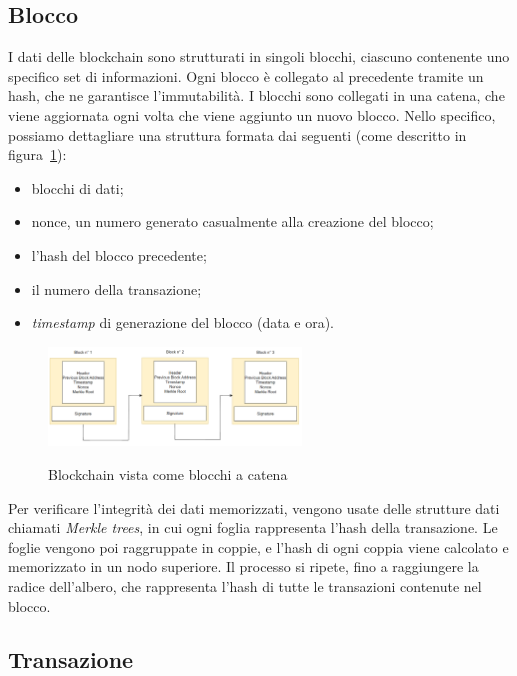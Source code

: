 \subsection{Blocco}\label{sec:tecnologie-blockchain-blocco}

I dati delle blockchain sono strutturati in singoli blocchi, ciascuno contenente uno specifico set di informazioni.
Ogni blocco è collegato al precedente tramite un hash, che ne garantisce l'immutabilità.
I blocchi sono collegati in una catena, che viene aggiornata ogni volta che viene aggiunto un nuovo blocco.
Nello specifico, possiamo dettagliare una struttura formata dai seguenti (come descritto in figura~\ref{fig:blocco}):
\begin{itemize}
    \item blocchi di dati;
    \item nonce, un numero generato casualmente alla creazione del blocco;
    \item l'hash del blocco precedente;
    \item il numero della transazione;
    \item \textit{timestamp} di generazione del blocco (data e ora).
\end{itemize} 

\begin{figure}[h]
    \centering
    \includegraphics[width=0.6\textwidth, alt={Blocco all'interno di una blockchain}]{immagini/blocco.png}
    \caption{Blockchain vista come blocchi a catena}\label{fig:blocco}
\end{figure}

Per verificare l'integrità dei dati memorizzati, vengono usate delle strutture dati chiamati \textit{Merkle trees}, in cui ogni foglia rappresenta l'hash della transazione.
Le foglie vengono poi raggruppate in coppie, e l'hash di ogni coppia viene calcolato e memorizzato in un nodo superiore.
Il processo si ripete, fino a raggiungere la radice dell'albero, che rappresenta l'hash di tutte le transazioni contenute nel blocco.

\subsection{Transazione}\label{sec:tecnologie-blockchain-transazione}

